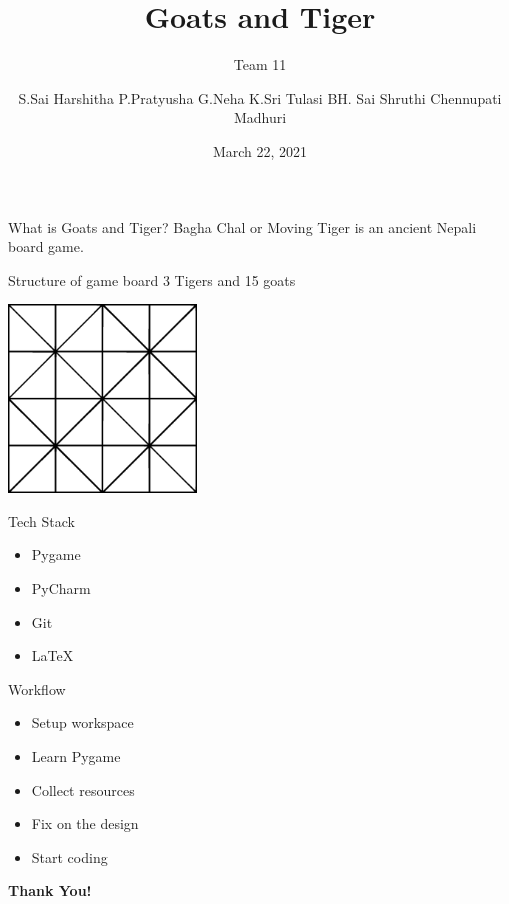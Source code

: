 \documentclass[14pt]{beamer}
\title{Goats and Tiger}
\subtitle{Team 11}
\author[]{S.Sai Harshitha \newline P.Pratyusha \newline G.Neha \newline K.Sri Tulasi \newline BH. Sai Shruthi \newline Chennupati Madhuri}
\date{March 22, 2021}
\begin{document}
\begin{frame}
	\titlepage
\end{frame}
\begin{frame}{What is Goats and Tiger?}
		Bagha Chal or Moving Tiger is an ancient Nepali board game.
\end{frame}

\begin{frame}{Structure of game board}
	3 Tigers and 15 goats
	\begin{center}
		\includegraphics[width=5cm, height=5cm]{goatsTiger_conv.eps}
	\end{center}
\end{frame}

\begin{frame}{Tech Stack}
	\begin{itemize}
		\item Pygame
        	\item PyCharm
		\item Git
        	\item LaTeX
	\end{itemize}
\end{frame}

\begin{frame}{Workflow}
	\begin{itemize}
		\item Setup workspace
		\item Learn Pygame
		\item Collect resources
		\item Fix on the design
		\item Start coding
	\end{itemize}
\end{frame}

\begin{frame}
	\begin{center}
	\textbf{\huge Thank You!}
	\end{center}
\end{frame}
\end{document}
